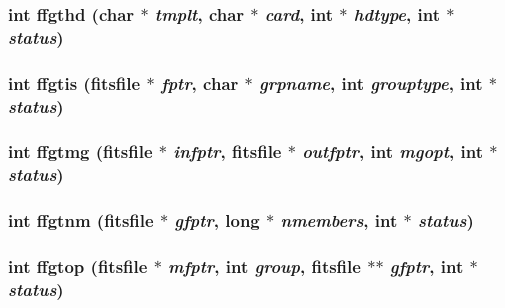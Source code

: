 \subsubsection{\setlength{\rightskip}{0pt plus 5cm}int ffgthd (char $\ast$ {\em tmplt}, char $\ast$ {\em card}, int $\ast$ {\em hdtype}, int $\ast$ {\em status})}\label{fitsio__64_8h_d6a4e75b3a5f5458a4879db512e5dc79}


\subsubsection{\setlength{\rightskip}{0pt plus 5cm}int ffgtis (\bf{fitsfile} $\ast$ {\em fptr}, char $\ast$ {\em grpname}, int {\em grouptype}, int $\ast$ {\em status})}\label{fitsio__64_8h_ad66e057c6116029d10db0638ff52a79}


\subsubsection{\setlength{\rightskip}{0pt plus 5cm}int ffgtmg (\bf{fitsfile} $\ast$ {\em infptr}, \bf{fitsfile} $\ast$ {\em outfptr}, int {\em mgopt}, int $\ast$ {\em status})}\label{fitsio__64_8h_aada40a732e548823c7f5a64114de6b7}


\subsubsection{\setlength{\rightskip}{0pt plus 5cm}int ffgtnm (\bf{fitsfile} $\ast$ {\em gfptr}, long $\ast$ {\em nmembers}, int $\ast$ {\em status})}\label{fitsio__64_8h_b80f93976748e97b100bb159c245ed96}


\subsubsection{\setlength{\rightskip}{0pt plus 5cm}int ffgtop (\bf{fitsfile} $\ast$ {\em mfptr}, int {\em group}, \bf{fitsfile} $\ast$$\ast$ {\em gfptr}, int $\ast$ {\em status})}\label{fitsio__64_8h_57ba25ba0c05bbdf61f15e21900264ec}


